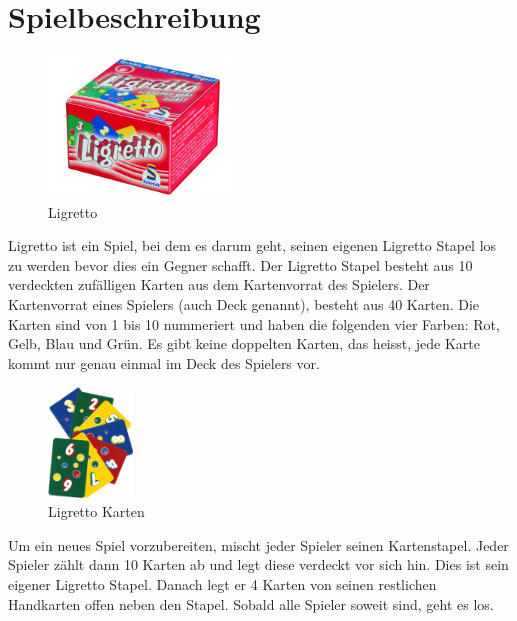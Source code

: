 \section{Spielbeschreibung}

\begin{figure}[hbt]
  \centering
  \includegraphics[width=0.45\textwidth,angle=0]{graphics/ligretto.jpg}
  \caption{Ligretto \hfill{} }
 \end{figure}

Ligretto ist ein Spiel, bei dem es darum geht, seinen eigenen Ligretto Stapel los zu werden bevor dies ein Gegner schafft. Der Ligretto Stapel besteht aus 10 verdeckten zufälligen Karten aus dem Kartenvorrat des Spielers. Der Kartenvorrat eines Spielers (auch Deck genannt), besteht aus 40 Karten. Die Karten sind von 1 bis 10 nummeriert und haben die folgenden vier Farben: Rot, Gelb, Blau und Grün. Es gibt keine doppelten Karten, das heisst, jede Karte kommt nur genau einmal im Deck des Spielers vor.

\begin{figure}[hbt]
  \centering
  \includegraphics[width=0.20\textwidth,angle=0]{graphics/ligretto.png}
  \caption{Ligretto Karten \hfill{} }
 \end{figure}

Um ein neues Spiel vorzubereiten, mischt jeder Spieler seinen Kartenstapel. Jeder Spieler zählt dann 10 Karten ab und legt diese verdeckt vor sich hin. Dies ist sein eigener Ligretto Stapel. Danach legt er 4 Karten von seinen restlichen Handkarten offen neben den Stapel. Sobald alle Spieler soweit sind, geht es los.

